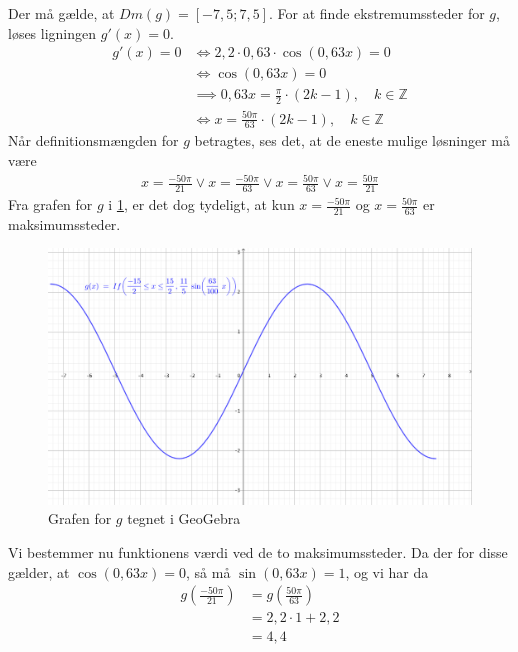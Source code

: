 \documentclass{article}
\begin{document}
Der må gælde, at $Dm(g)=[-7,5;7,5]$.
For at finde ekstremumssteder for $g$, løses ligningen $g'(x)=0$. 
\begin{equation*}
\begin{split}
  g'(x)=0 &\iff 2,2 \cdot 0,63 \cdot \cos\left(0,63x\right) =0\\
  &\iff \cos\left(0,63 x\right) =0\\
  &\implies  0,63 x = \frac{\pi }{2} \cdot \left(2k - 1\right), \quad k \in \mathbb{Z}\\
  &\iff x=\frac{50\pi }{63} \cdot \left(2k - 1\right), \quad k \in \mathbb{Z}
\end{split}
\end{equation*}
Når definitionsmængden for $g$ betragtes, ses det, at de eneste mulige løsninger må være 
\begin{equation*}
\begin{split}
  x=\frac{-50 \pi }{21} \lor x=\frac{-50 \pi }{63} \lor x=\frac{50 \pi }{63} \lor x=\frac{50 \pi }{21}
\end{split}
\end{equation*}
Fra grafen for $g$ i \cref{fig:ggraf}, er det dog tydeligt, at kun $x=\frac{-50 \pi }{21}$ og $x=\frac{50 \pi }{63}$ er maksimumssteder. 
\begin{figure}[H]
\begin{center}
  \includegraphics[width=\textwidth]{ggraf.png}
\end{center}
\caption{Grafen for $g$ tegnet i GeoGebra }
\label{fig:ggraf}
\end{figure}
Vi bestemmer nu funktionens værdi ved de to maksimumssteder.
Da der for disse gælder, at $\cos\left(0,63 x\right) =0$, så må $\sin\left(0,63 x\right) =1$, og vi har da
\begin{equation*}
\begin{split}
  g\left(\frac{-50 \pi }{21}\right) &= g\left(\frac{50 \pi }{63}\right)\\
  &=2,2 \cdot 1 +2,2\\
  &=4,4
\end{split}
\end{equation*}
\end{document}
